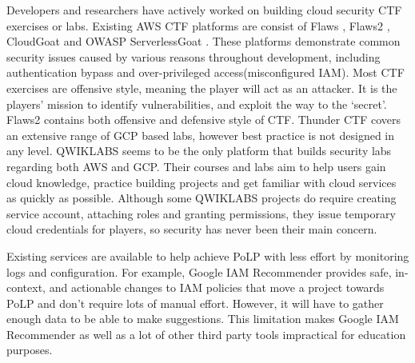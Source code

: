 \noindent Developers and researchers have actively worked on building cloud security CTF exercises or labs. Existing AWS CTF platforms are consist of  Flaws \cite{flaws}, Flaws2 \cite{flaws2}, CloudGoat \cite{cloudgoat} and OWASP ServerlessGoat \cite{serverlessgoat}. These platforms demonstrate common security issues caused by various reasons throughout development, including authentication bypass and over-privileged access(misconfigured IAM). Most CTF exercises are offensive style, meaning the player will act as an attacker. It is the players’ mission to identify vulnerabilities, and exploit the way to the ‘secret’. Flaws2 contains both offensive and defensive style of CTF. Thunder CTF \cite{thunder-ctf} covers an extensive range of GCP based labs, however best practice is not designed in any level. QWIKLABS \cite{QWIKLABS} seems to be the only platform that builds security labs regarding both AWS and GCP. Their courses and labs aim to help users gain cloud knowledge, practice building projects and get familiar with cloud services as quickly as possible. Although some QWIKLABS projects do require creating service account, attaching roles and granting permissions, they issue temporary cloud credentials for players, so security has never been their main concern.

Existing services are available to help achieve PoLP with less effort by monitoring logs and configuration. For example, Google IAM Recommender \cite{GoogleLstRec} provides safe, in-context, and actionable changes to IAM policies that move a project towards PoLP and don’t require lots of manual effort. However, it will have to gather enough data to be able to make suggestions. This limitation makes Google IAM Recommender as well as a lot of other third party tools impractical for education purposes.